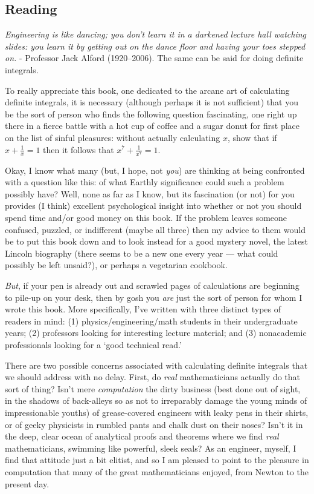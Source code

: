 


\subsection*{Reading}
\begin{center}
  \textit{Engineering is like dancing; you don’t learn it in a darkened lecture hall watching slides: you learn it by getting out on the dance floor and having your toes stepped on.} - Professor Jack Alford (1920–2006). The same can be said for doing definite integrals.
\end{center}

To really appreciate this book, one dedicated to the arcane art of calculating
definite integrals, it is necessary (although perhaps it is not sufficient) that you be
the sort of person who finds the following question fascinating, one right up there in
a fierce battle with a hot cup of coffee and a sugar donut for first place on the list of
sinful pleasures: without actually calculating $x$, show that if $ x + \frac{1}{x} = 1 $
then it follows that $ x^7 + \frac{1}{x^7} = 1 $.

Okay, I know what many (but, I hope, not \textit{you}) are thinking at being confronted
with a question like this: of what Earthly significance could such a problem possibly
have? Well, none as far as I know, but its fascination (or not) for
you provides (I think) excellent psychological insight into whether or not
you should spend time and/or good money on this book. If the problem leaves someone confused, puzzled,
or indifferent (maybe all three) then my advice to them would be to put this book
down and to look instead for a good mystery novel, the latest Lincoln biography
(there seems to be a new one every year --- what could
possibly be left unsaid?), or perhaps a vegetarian cookbook.

\textit{But}, if your pen is already out and scrawled pages of calculations are beginning
to pile-up on your desk, then by gosh you \textit{are} just the sort of person for whom I
wrote this book. More specifically, I’ve written with three distinct types of
readers in mind: (1) physics/engineering/math students in their undergraduate
years; (2) professors looking for interesting lecture material; and (3) nonacademic
professionals looking for a ‘good technical read.’

There are two possible concerns associated with calculating definite integrals
that we should address with no delay. First, do \textit{real} mathematicians actually do that
sort of thing? Isn’t mere \textit{computation} the dirty business (best done out of sight, in
the shadows of back-alleys so as not to irreparably damage the young minds of
impressionable youths) of grease-covered engineers with leaky pens in their shirts,
or of geeky physicists in rumbled pants and chalk dust on their noses? Isn’t it in the
deep, clear ocean of analytical proofs and theorems where we find \textit{real}
mathematicians, swimming like powerful, sleek seals? As an engineer, myself, I find that
attitude just a bit elitist, and so I am pleased to point to the pleasure in computation
that many of the great mathematicians enjoyed, from Newton to the present day.

